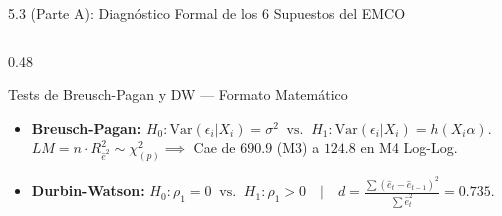 \documentclass[aspectratio=169, 9pt]{beamer}
\begin{document}
\begin{frame}{5.3 (Parte A): Diagnóstico Formal de los 6 Supuestos del EMCO}
\begin{columns}[T]
\begin{column}{0.48\textwidth}
    \begin{exampleblock}{\footnotesize Tests de Breusch-Pagan y DW — Formato Matemático}
      \scriptsize
      \begin{itemize}\setlength{\itemsep}{1pt}
        \item \textbf{Breusch-Pagan:} $H_0: \text{Var}(\epsilon_i|X_i) = \sigma^2 \;\;\text{vs.}\;\; H_1: \text{Var}(\epsilon_i|X_i) = h(X_i\alpha)$.\\
        $LM = n\cdot R^2_{\hat{e}^2} \sim \chi^2_{(p)} \implies$ Cae de $690.9$ (M3) a $\mathbf{124.8}$ en M4 Log-Log.
        \item \textbf{Durbin-Watson:} $H_0: \rho_1 = 0 \;\;\text{vs.}\;\; H_1: \rho_1 > 0 \quad \Big|\quad d = \frac{\sum(\hat{e}_t - \hat{e}_{t-1})^2}{\sum \hat{e}_t^2} = \mathbf{0.735}$.
      \end{itemize}
    \end{exampleblock}
  \end{column}
\end{columns}
\end{frame}
\end{document}
